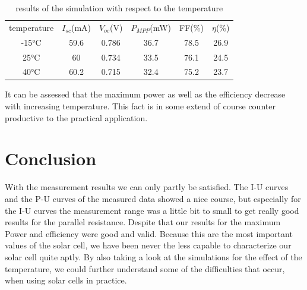\documentclass[a4paper, 12pt]{scrartcl}
\begin{document}
\begin{table}[H]\centering\begin{tabular}{|c | c |c | c |c |c|}\hline
\multirow[c]{2}{*}{temperature}&\multirow[c]{2}{1cm}{$I_{sc}$\newline(mA)}&\multirow[c]{2}{1cm}{$V_{oc}$\newline(V)}&\multirow[c]{2}{1cm}{$P_{MPP}$\newline(mW)}&\multirow[c]{2}{1cm}{FF\newline(\%)}&\multirow[c]{2}{1cm}{$\eta$\newline(\%)}\\
&&&&&\\\hline\hline
-15°C&59.6&0.786&36.7&78.5&26.9\\\hline
25°C&60&0.734&33.5&76.1&24.5\\\hline
40°C&60.2&0.715&32.4&75.2&23.7\\\hline
\end{tabular}\caption{results of the simulation with respect to the temperature}\end{table}
It can be assessed that the maximum power as well as the efficiency decrease with increasing temperature. This fact is in some extend of course counter productive to the practical application.
\newpage
\section{Conclusion}
With the measurement results we can only partly be satisfied. The I-U curves and the P-U curves of the measured data showed a nice course, but especially for the I-U curves the measurement range was a little bit to small to get really good results for the parallel resistance. Despite that our results for the maximum Power and efficiency were good and valid. Because this are the most important values of the solar cell, we have been never the less capable to characterize our solar cell quite aptly. By also taking a look at the simulations for the effect of the temperature, we could further understand some of the difficulties that occur, when using solar cells in practice.
\end{document}
